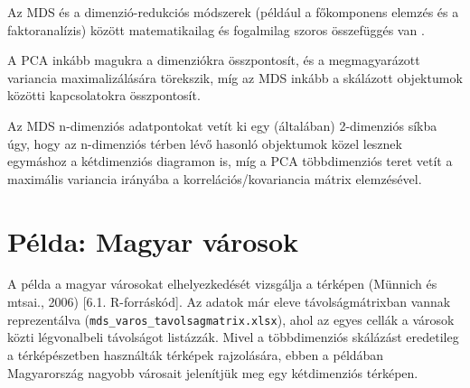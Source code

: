 \documentclass[
  letterpaper,
]{krantz}
\begin{document}
Az MDS és a dimenzió-redukciós módszerek (például a főkomponens elemzés
és a faktoranalízis) között matematikailag és fogalmilag szoros
összefüggés van .

A PCA inkább magukra a dimenziókra összpontosít, és a megmagyarázott
variancia maximalizálására törekszik, míg az MDS inkább a skálázott
objektumok közötti kapcsolatokra összpontosít.

Az MDS n-dimenziós adatpontokat vetít ki egy (általában) 2-dimenziós
síkba úgy, hogy az n-dimenziós térben lévő hasonló objektumok közel
lesznek egymáshoz a kétdimenziós diagramon is, míg a PCA többdimenziós
teret vetít a maximális variancia irányába a korrelációs/kovariancia
mátrix elemzésével.

\hypertarget{puxe9lda-magyar-vuxe1rosok}{%
\section{Példa: Magyar városok}\label{puxe9lda-magyar-vuxe1rosok}}

A példa a magyar városokat elhelyezkedését vizsgálja a térképen (Münnich
és mtsai., 2006) {[}6.1. R-forráskód{]}. Az adatok már eleve
távolságmátrixban vannak reprezentálva
(\texttt{mds\_varos\_tavolsagmatrix.xlsx}), ahol az egyes cellák a
városok közti légvonalbeli távolságot listázzák. Mivel a többdimenziós
skálázást eredetileg a térképészetben használták térképek rajzolására,
ebben a példában Magyarország nagyobb városait jelenítjük meg egy
kétdimenziós térképen.
\end{document}

